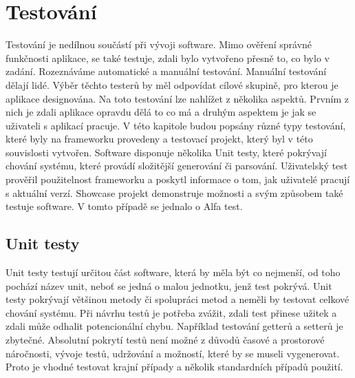 \chapter{Testování}
Testování je nedílnou součástí při vývoji software. Mimo ověření správné funkčnosti aplikace, se také testuje, zdali bylo vytvořeno přesně to, co bylo v zadání. Rozeznáváme automatické a manuální testování. Manuální testování dělají lidé. Výběr těchto testerů by měl odpovídat cílové skupině, pro kterou je aplikace designována. Na toto testování lze nahlížet z několika aspektů. Prvním z nich je zdali aplikace opravdu dělá to co má a druhým aspektem je jak se uživateli s aplikací pracuje. V této kapitole budou popsány různé typy testování, které byly na frameworku provedeny a testovací projekt, který byl v této souvislosti vytvořen. Software disponuje několika Unit testy, které pokrývají chování systému, které provádí složitější generování či parsování. Uživatelský test prověřil použitelnost frameworku a poskytl informace o tom, jak uživatelé pracují s aktuální verzí. Showcase projekt demonstruje možnosti a svým způsobem také testuje software. V tomto případě se jednalo o Alfa test.

\section{Unit testy}
Unit testy testují určitou část software, která by měla být co nejmenší, od toho pochází název unit, neboť se jedná o malou jednotku, jenž test pokrývá. Unit testy pokrývají většinou metody či spolupráci metod a neměli by testovat celkové chování systému. Při návrhu testů je potřeba zvážit, zdali test přinese užitek a zdali může odhalit potencionální chybu. Například testování getterů a setterů je zbytečné. Absolutní pokrytí testů není možné z důvodů časové a prostorové náročnosti, vývoje testů, udržování a možností, které by se museli vygenerovat. Proto je vhodné testovat krajní případy a několik standardních případů použití. 

